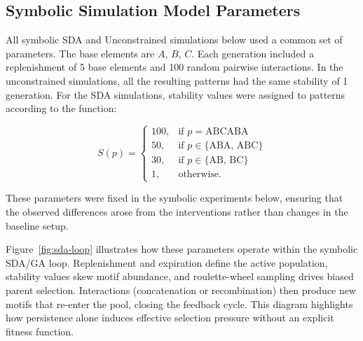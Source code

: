 \documentclass[life,article,submit,pdftex,moreauthors]{Definitions/mdpi}
\begin{document}
\subsection{Symbolic Simulation Model Parameters}

All symbolic SDA and Unconstrained simulations below used a common set of parameters. The base elements are $A$, $B$, $C$.
Each generation included
a replenishment of 5 base elements and 100 random pairwise
interactions. In the unconstrained simulations, all the resulting patterns had the same stability of 1 generation. For the SDA simulations, 
stability values were assigned to patterns according to the
function:

\begin{equation}
S(p) =
\begin{cases}
100, & \text{if } p = \text{ABCABA} \\
50, & \text{if } p \in \{\text{ABA, ABC}\} \\
30, & \text{if } p \in \{\text{AB, BC}\} \\
1, & \text{otherwise}.
\end{cases}
\end{equation}

These parameters were fixed in the symbolic experiments below, ensuring that the observed differences arose from the interventions rather than changes in
the baseline setup.

Figure~\ref{fig:sda-loop} illustrates how these parameters operate within the
symbolic SDA/GA loop. Replenishment and expiration define the active population, 
stability values skew motif abundance, and roulette-wheel sampling drives
biased parent selection. Interactions (concatenation or recombination) then
produce new motifs that re-enter the pool, closing the feedback cycle. 
This diagram highlights how persistence alone induces effective selection
pressure without an explicit fitness function.
\end{document}
